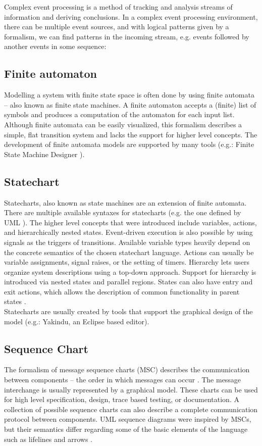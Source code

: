 Complex event processing is a method of tracking and analysis streams of information and deriving conclusions. In a complex event processing environment, there can be multiple event sources, and with logical patterns given by a formalism, we can find patterns in the incoming stream, e.g. events followed by another events in some sequence: \citep{epbas}

\subsection*{Finite automaton}

Modelling a system with finite state space is often done by using finite automata -- also known as finite state machines. A finite automaton accepts a (finite) list of symbols and produces a computation of the automaton for each input list.
Although finite automata can be easily visualized, this formalism describes a simple, flat transition system and lacks the support for higher level concepts. The development of finite automata models  are supported by many tools (e.g.: Finite State Machine Designer \citep{yakindu}).

\subsection*{Statechart}

Statecharts, also known as state machines are an extension of finite automata. There are multiple available syntaxes for statecharts (e.g. the one defined by UML \citep{stcuml}). The higher level concepts that were introduced include variables, actions, and hierarchically nested states. Event-driven execution is also possible by using signals as the triggers of transitions. Available variable types heavily depend on the concrete semantics of the chosen statechart language. Actions can usually be variable assignments, signal raises, or the setting of timers. Hierarchy lets users organize system descriptions using a top-down approach. Support for hierarchy is introduced via nested states and parallel regions. States can also have entry and exit actions, which allows the description of common functionality in parent states \citep{stcmove}.\\
Statecharts are usually created by tools that support the graphical design of the model (e.g.: Yakindu, an Eclipse based editor).


\subsection*{Sequence Chart}

The formalism of message sequence charts (MSC) describes the communication between components -- the order in which messages can occur \citep{msc} \citep{msc2}. The message interchange is usually represented by a graphical model. These charts can be used for high level specification, design, trace based testing, or documentation. A collection of possible sequence charts can also describe a complete communication protocol between components. UML sequence diagrams were inspired by MSCs, but their semantics differ regarding some of the basic elements of the language such as lifelines and arrows \citep{mscuml}.
